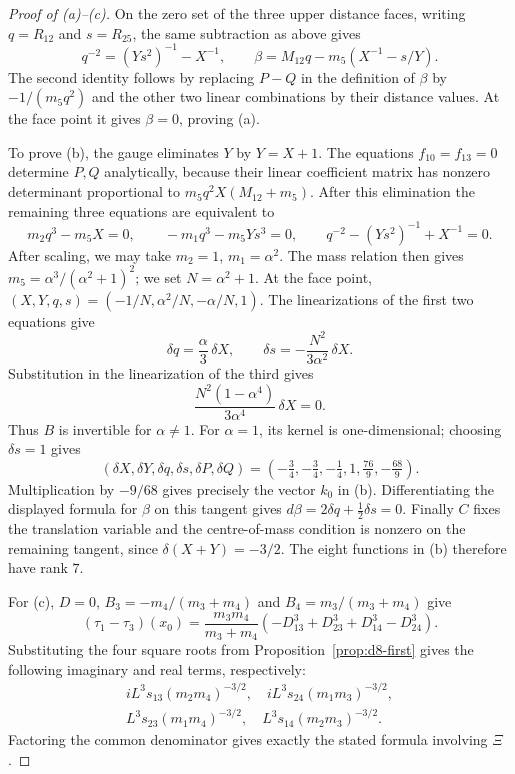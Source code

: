 \documentclass[11pt]{amsart}
\theoremstyle{definition}
\theoremstyle{remark}
\begin{document}
{\begin{proof}[Proof of (a)--(c)]
On the zero set of the three upper distance faces, writing $q=R_{12}$
and $s=R_{25}$, the same subtraction as above gives
\[
q^{-2}=(Ys^2)^{-1}-X^{-1},\qquad
\beta=M_{12}q-m_5(X^{-1}-s/Y).
\]
The second identity follows by replacing $P-Q$ in the definition of
$\beta$ by $-1/(m_5q^2)$ and the other two linear combinations by their
distance values. At the face point it gives $\beta=0$, proving (a).

To prove (b), the gauge eliminates $Y$ by $Y=X+1$.
The equations $f_{10}=f_{13}=0$ determine $P,Q$ analytically, because
their linear coefficient matrix has nonzero determinant proportional to
$m_5q^2X(M_{12}+m_5)$.
After this elimination the remaining three equations are equivalent to
\[
m_2q^3-m_5X=0,\qquad
-m_1q^3-m_5Ys^3=0,\qquad
q^{-2}-(Ys^2)^{-1}+X^{-1}=0.
\]
After scaling, we may take $m_2=1$, $m_1=\alpha^2$.  The mass relation then gives
$m_5=\alpha^3/(\alpha^2+1)^2$; we set $N=\alpha^2+1$.
At the face point,
$(X,Y,q,s)=(-1/N,\alpha^2/N,-\alpha/N,1)$.
The linearizations of the first two equations give
\[
\delta q=\frac\alpha3\,\delta X,\qquad
\delta s=-\frac{N^2}{3\alpha^2}\,\delta X.
\]
Substitution in the linearization of the third gives
\[
\frac{N^2(1-\alpha^4)}{3\alpha^4}\,\delta X=0.
\]
Thus $B$ is invertible for $\alpha\ne1$.
For $\alpha=1$, its kernel is one-dimensional; choosing $\delta s=1$
gives
\[
(\delta X,\delta Y,\delta q,\delta s,\delta P,\delta Q)
=(-\tfrac34,-\tfrac34,-\tfrac14,1,\tfrac{76}{9},-\tfrac{68}{9}).
\]
Multiplication by $-9/68$ gives precisely the vector $k_0$ in (b).
Differentiating the displayed formula for $\beta$ on this tangent gives
$d\beta=2\delta q+\tfrac12\delta s=0$.
Finally $C$ fixes the translation variable and the centre-of-mass
condition is nonzero on the remaining tangent, since
$\delta(X+Y)=-3/2$. The eight functions in (b) therefore have rank $7$.

For (c), $D=0$, $B_3=-m_4/(m_3+m_4)$ and $B_4=m_3/(m_3+m_4)$ give
\[
(\tau_1-\tau_3)(x_0)
=\frac{m_3m_4}{m_3+m_4}
(-D_{13}^3+D_{23}^3+D_{14}^3-D_{24}^3).
\]
Substituting the four square roots from Proposition~\ref{prop:d8-first}
gives the following imaginary and real terms, respectively:
\[
\begin{gathered}
 iL^3s_{13}(m_2m_4)^{-3/2},\quad iL^3s_{24}(m_1m_3)^{-3/2},\\
 L^3s_{23}(m_1m_4)^{-3/2},\quad L^3s_{14}(m_2m_3)^{-3/2}.
\end{gathered}
\]
Factoring the common denominator gives
exactly the stated formula involving $\Xi$.
\end{proof}

}
\end{document}
